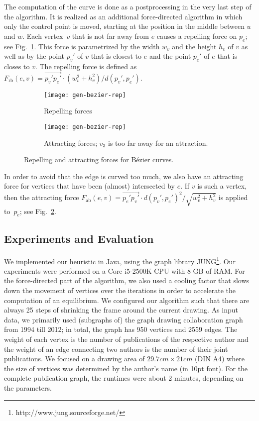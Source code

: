 \documentclass[]{llncs}
\newcommand{\frepbezier}{\ensuremath{F_\mathrm{rb}}\xspace}
\newcommand{\fattbezier}{\ensuremath{F_\mathrm{ab}}\xspace}
\begin{document}
The computation of the curve is done as a postprocessing in the very
last step of the algorithm. It is realized as an additional
force-directed algorithm in which only the control point is moved,
starting at the position in the middle between $u$ and $w$. Each
vertex~$v$ that is not far away from $e$ causes a repelling force on
$p_e$; see Fig.~\ref{fig:gen-bezier-rep}. This force is parametrized by
the width $w_v$ and the height $h_v$ of $v$ as well as by the point
$p_v'$ of $v$ that is closest to $e$ and the point $p_e'$ of
$e$ that is closes to $v$. The repelling force is defined as
$\frepbezier(e,v) = \overrightarrow{p_v' p_e'} \cdot (w_v^2 +
h_v^2)/d(p_v', p_e')$.
\begin{figure}[tb]
	\begin{subfigure}[t]{.38\textwidth}
		\centering
		\texttt{[image: gen-bezier-rep]}
		\caption{Repelling forces}
		\label{fig:gen-bezier-rep}
	\end{subfigure}
	\hfill
	\begin{subfigure}[t]{.58\textwidth}
		\centering
		\texttt{[image: gen-bezier-rep]}
		\caption{Attracting forces; $v_3$ is too far away for an
		attraction.}
		\label{fig:gen-bezier-attr}
	\end{subfigure}
	\caption{Repelling and attracting forces for B\'ezier curves.}
	\label{fig:gen}
\end{figure}

In order to avoid that the edge is curved too
much, we also have an attracting force for vertices that have been
(almost) intersected by $e$. If $v$ is such a vertex, then the
attracting force $\fattbezier(e,v) = \overrightarrow{p_e' p_v'} \cdot
d(p_v', p_e')^2/\sqrt{w_v^2 + h_v^2}$ is applied to~$p_e$; see
Fig.~\ref{fig:gen-bezier-attr}.


\subsection{Experiments and Evaluation}
We implemented our heuristic in Java, using the graph library
JUNG\footnote{http://www.jung.sourceforge.net/}. Our experiments were
performed on a Core i5-2500K CPU with 8 GB of RAM. For the
force-directed part of the algorithm, we also used a cooling factor
that slows down the movement of vertices over the iterations in order
to accelerate the computation of an equilibrium. We configured our
algorithm such that there are always 25 steps of shrinking the frame
around the current drawing. As input data,
we primarily used (subgraphs of) the graph drawing collaboration graph
from 1994 till 2012; in total, the graph has 950 vertices and 2559
edges. The weight of each vertex is the number of
publications of the respective author and the weight of an edge
connecting two authors is the number of their joint publications.
We focused on a drawing area of $29.7 cm \times 21 cm$ (DIN A4) where
the size of vertices was determined by the author's name (in 10pt
font). For the complete publication graph, the runtimes were about 2
minutes, depending on the parameters.
\end{document}
